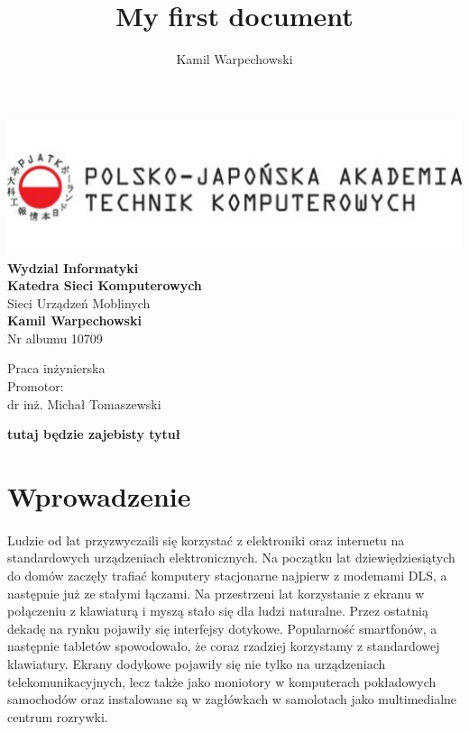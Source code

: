 \documentclass[12pt]{article}
\title{My first document}
\author{Kamil Warpechowski}
\begin{document}
\thispagestyle{firststyle}
\begin{center}
\includegraphics[width=1\textwidth]{images/logo.jpg}
\textbf{Wydzial Informatyki} \\
\vspace{3em}
\textbf{Katedra Sieci Komputerowych} \\
Sieci Urządzeń Moblinych \\
\vspace{3em}
\textbf{Kamil Warpechowski} \\
Nr albumu 10709
\end{center}


\vspace{3em}
{\addtolength{\leftskip}{70mm}

\noindent
Praca inżynierska
\\Promotor:
\\dr inż. Michał Tomaszewski

}

\vspace{3em}

\textbf {
	tutaj będzie zajebisty tytuł
}

\newpage
\tableofcontents
\newpage
  
\section{Wprowadzenie}
\paragraph{}
Ludzie od lat przyzwyczaili się korzystać z elektroniki oraz internetu na standardowych urządzeniach elektronicznych. Na początku lat dziewiędziesiątych do domów zaczęły trafiać komputery stacjonarne najpierw z modemami DLS, a następnie już ze stałymi łączami. Na przestrzeni lat korzystanie z ekranu w połączeniu z klawiaturą i myszą stało się dla ludzi naturalne. Przez ostatnią dekadę na rynku pojawiły się interfejsy dotykowe. Popularność smartfonów, a następnie tabletów spowodowało, że coraz rzadziej korzystamy z standardowej klawiatury.
Ekrany dodykowe pojawiły się nie tylko na urządzeniach telekomunikacyjnych, lecz także jako moniotory w komputerach pokładowych samochodów oraz instalowane są w zagłówkach w samolotach jako multimedialne centrum rozrywki.
\end{document}
